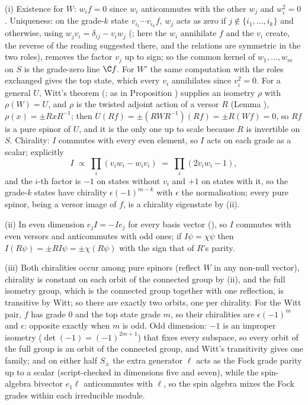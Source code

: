 (i) Existence for $W$: $w_{i}f = 0$ since $w_{i}$ anticommutes with the other $w_{j}$ and $w_{i}^{2} = 0$. Uniqueness: on the grade-$k$ state $v_{i_{1}}\cdots v_{i_{k}}f$, $w_{j}$ acts as zero if $j \notin \{i_{1}, \ldots, i_{k}\}$ and otherwise, using $w_{j}v_{i} = \delta_{ij} - v_{i}w_{j}$ (; here the $w_{i}$ annihilate $f$ and the $v_{i}$ create, the reverse of the reading suggested there, and the relations are symmetric in the two roles), removes the factor $v_{j}$ up to sign; so the common kernel of $w_{1}, \ldots, w_{m}$ on $S$ is the grade-zero line $\C f$. For $W'$ the same computation with the roles exchanged gives the top state, which every $v_{i}$ annihilates since $v_{i}^{2} = 0$. For a general $U$, Witt's theorem (; as in Proposition ) supplies an isometry $\rho$ with $\rho(W) = U$, and $\rho$ is the twisted adjoint action of a versor $R$ (Lemma ), $\rho(x) = \pm RxR^{-1}$; then $U(Rf) = \pm (RWR^{-1})(Rf) = \pm R(Wf) = 0$, so $Rf$ is a pure spinor of $U$, and it is the only one up to scale because $R$ is invertible on $S$. Chirality: $I$ commutes with every even element, so $I$ acts on each grade as a scalar; explicitly
\[
I \;\propto\; \prod_{i}(v_{i}w_{i} - w_{i}v_{i}) \;=\; \prod_{i}(2v_{i}w_{i} - 1),
\]
and the $i$-th factor is $-1$ on states without $v_{i}$ and $+1$ on states with it, so the grade-$k$ states have chirality $\epsilon(-1)^{m-k}$ with $\epsilon$ the normalisation; every pure spinor, being a versor image of $f$, is a chirality eigenstate by (ii).

(ii) In even dimension $e_{j}I = -Ie_{j}$ for every basis vector (), so $I$ commutes with even versors and anticommutes with odd ones; if $I\psi = \chi\psi$ then $I(R\psi) = \pm R I\psi = \pm\chi(R\psi)$ with the sign that of $R$'s parity.

(iii) Both chiralities occur among pure spinors (reflect $W$ in any non-null vector), chirality is constant on each orbit of the connected group by (ii), and the full isometry group, which is the connected group together with one reflection, is transitive by Witt; so there are exactly two orbits, one per chirality. For the Witt pair, $f$ has grade $0$ and the top state grade $m$, so their chiralities are $\epsilon(-1)^{m}$ and $\epsilon$: opposite exactly when $m$ is odd. Odd dimension: $-1$ is an improper isometry ($\det(-1) = (-1)^{2m+1}$) that fixes every subspace, so every orbit of the full group is an orbit of the connected group, and Witt's transitivity gives one family; and on either half $S_{\pm}$ the extra generator $\ell$ acts as the Fock grade parity up to a scalar (script-checked in dimensions five and seven), while the spin-algebra bivector $e_{1}\ell$ anticommutes with $\ell$, so the spin algebra mixes the Fock grades within each irreducible module.

